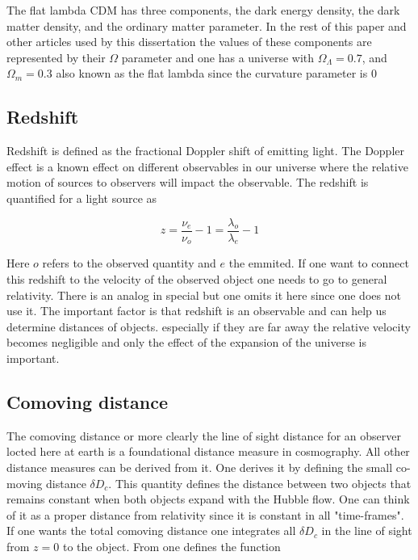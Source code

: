 \documentclass[11pt]{article}
\begin{document}
The flat lambda CDM has three components, the dark energy density, the dark matter density, and the ordinary matter parameter. In the rest of this paper and other articles used by this dissertation the values of these components are represented by their $\Omega$ parameter and one has a universe with $\Omega_\Lambda = 0.7$, and $\Omega_m = 0.3$ also known as the flat lambda since the curvature parameter is $0$


\subsection{Redshift}
Redshift is defined as the fractional Doppler shift of emitting light. The Doppler effect is a known effect on different observables in our universe where the relative motion of sources to observers will impact the observable. The redshift is quantified for a light source as 

\begin{equation}
    z = \frac{\nu_e}{\nu_o}-1 = \frac{\lambda_o}{\lambda_e}-1
\end{equation}

Here $o$ refers to the observed quantity and $e$ the emmited. If one want to connect this redshift to the velocity of the observed object one needs to go to general relativity. There is an analog in special but one omits it here since one does not use it. The important factor is that redshift is an observable and can help us determine distances of objects. especially if they are far away the relative velocity becomes negligible and only the effect of the expansion of the universe is important. 


\subsection{Comoving distance}
The comoving distance or more clearly the line of sight distance for an observer locted here at earth is a foundational distance measure in cosmography. All other distance measures can be derived from it. One derives it by defining the small co-moving distance $\delta D_c$. This quantity defines the distance between two objects that remains constant when both objects expand with the Hubble flow. One can think of it as a proper distance from relativity since it is constant in all "time-frames". If one wants the total comoving distance one integrates all $\delta D_c$ in the line of sight from $z= 0$ to the object. From  \cite{hogg2000distance} one defines the function 
\end{document}
